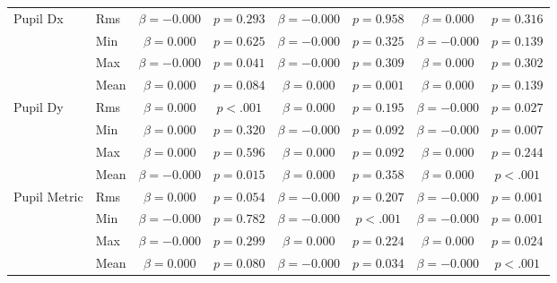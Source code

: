 \begin{tabular}{llcc|cc|cc}
\midrule
\multirow{4}{*}{Pupil Dx} & Rms & $\beta = -0.000$ & $p = 0.293$ & $\beta = -0.000$ & $p = 0.958$ & $\beta = 0.000$ & $p = 0.316$ \\
 & Min & $\beta = 0.000$ & $p = 0.625$ & $\beta = -0.000$ & $p = 0.325$ & $\beta = -0.000$ & $p = 0.139$ \\
 & Max & $\beta = -0.000$ & $p = 0.041$ & $\beta = -0.000$ & $p = 0.309$ & $\beta = 0.000$ & $p = 0.302$ \\
 & Mean & $\beta = 0.000$ & $p = 0.084$ & $\beta = 0.000$ & $p = 0.001$ & $\beta = 0.000$ & $p = 0.139$ \\
\midrule
\multirow{4}{*}{Pupil Dy} & Rms & $\beta = 0.000$ & $p < .001$ & $\beta = 0.000$ & $p = 0.195$ & $\beta = -0.000$ & $p = 0.027$ \\
 & Min & $\beta = 0.000$ & $p = 0.320$ & $\beta = -0.000$ & $p = 0.092$ & $\beta = -0.000$ & $p = 0.007$ \\
 & Max & $\beta = 0.000$ & $p = 0.596$ & $\beta = 0.000$ & $p = 0.092$ & $\beta = 0.000$ & $p = 0.244$ \\
 & Mean & $\beta = -0.000$ & $p = 0.015$ & $\beta = 0.000$ & $p = 0.358$ & $\beta = 0.000$ & $p < .001$ \\
\midrule
\multirow{4}{*}{Pupil Metric} & Rms & $\beta = 0.000$ & $p = 0.054$ & $\beta = -0.000$ & $p = 0.207$ & $\beta = -0.000$ & $p = 0.001$ \\
 & Min & $\beta = -0.000$ & $p = 0.782$ & $\beta = -0.000$ & $p < .001$ & $\beta = -0.000$ & $p = 0.001$ \\
 & Max & $\beta = -0.000$ & $p = 0.299$ & $\beta = 0.000$ & $p = 0.224$ & $\beta = 0.000$ & $p = 0.024$ \\
 & Mean & $\beta = 0.000$ & $p = 0.080$ & $\beta = -0.000$ & $p = 0.034$ & $\beta = -0.000$ & $p < .001$ \\
\midrule
\bottomrule
\end{tabular}